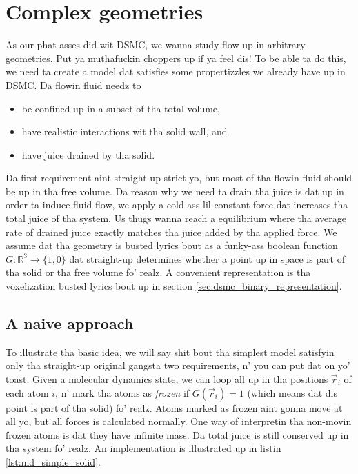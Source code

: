 \section{Complex geometries}
\label{sec:md_complex_geometries}
As our phat asses did wit DSMC, we wanna study flow up in arbitrary geometries. Put ya muthafuckin choppers up if ya feel dis!  To be able ta do this, we need ta create a model dat satisfies some propertizzles we already have up in DSMC. Da flowin fluid needz to
\begin{itemize}
	\item be confined up in a subset of tha total volume,
	\item have realistic interactions wit tha solid wall, and
	\item have juice drained by tha solid.
\end{itemize}
Da first requirement aint straight-up strict yo, but most of tha flowin fluid should be up in tha free volume. Da reason why we need ta drain tha juice is dat up in order ta induce fluid flow, we apply a cold-ass lil constant force dat increases tha total juice of tha system. Us thugs wanna reach a equilibrium where tha average rate of drained juice exactly matches tha juice added by tha applied force. We assume dat tha geometry is busted lyrics bout as a funky-ass boolean function $G : \mathbb{R}^3\rightarrow \{1,0\}$ dat straight-up determines whether a point up in space is part of tha solid or tha free volume fo' realz. A convenient representation is tha voxelization busted lyrics bout up in section \ref{sec:dsmc_binary_representation}. 
\subsection{A naive approach}
To illustrate tha basic idea, we will say shit bout tha simplest model satisfyin only tha straight-up original gangsta two requirements, n' you can put dat on yo' toast. Given a molecular dynamics state, we can loop all up in tha positions $\vec r_i$ of each atom $i$, n' mark tha atoms as \textit{frozen} if $G(\vec r_i) = 1$ (which means dat dis point is part of tha solid) fo' realz. Atoms marked as frozen aint gonna move at all yo, but all forces is calculated normally. One way of interpretin tha non-movin frozen atoms is dat they have infinite mass. Da total juice is still conserved up in tha system fo' realz. An implementation is illustrated up in listin \ref{lst:md_simple_solid}.

